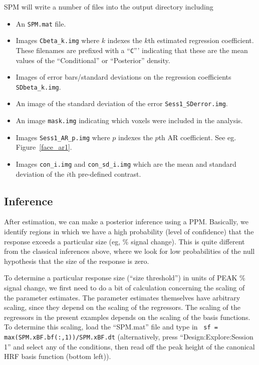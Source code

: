 SPM will write a number of files into the output directory including 
\begin{itemize}
\item An \texttt{SPM.mat} file.
\item Images \texttt{Cbeta\_k.img} where $k$ indexes the $k$th estimated regression coefficient. These filenames are prefixed with a ``\texttt{C}''' indicating that these are the mean values of the ``Conditional'' or ``Posterior'' density.
\item Images of error bars/standard deviations on the regression coefficients \texttt{SDbeta\_k.img}.
\item An image of the standard deviation of the error \texttt{Sess1\_SDerror.img}.
\item An image \texttt{mask.img} indicating which voxels  were included in the analysis.
\item Images \texttt{Sess1\_AR\_p.img} where $p$ indexes the $p$th AR coefficient. See eg. Figure~\ref{face_ar1}.
\item Images \texttt{con\_i.img} and \texttt{con\_sd\_i.img} which are the mean and standard deviation of the $i$th pre-defined contrast.
\end{itemize}

\subsection{Inference}

After estimation, we can make a posterior inference using a PPM. Basically, we identify regions in which we have a high probability (level of confidence) that the response exceeds a particular size (eg, \% signal change). This is quite different from the classical inferences above, where we look for low probabilities of the null hypothesis that the size of the response is zero.

To determine a particular response size (``size threshold'') in units of PEAK \% signal change, we first need to do a bit of calculation concerning the scaling of the parameter estimates. The parameter estimates themselves have arbitrary scaling, since they depend on the scaling of the regressors. The scaling of the regressors in the present examples depends on the scaling of the basis functions. To determine this scaling, load the ``SPM.mat'' file and type in \matlab\ \texttt{sf = max(SPM.xBF.bf(:,1))/SPM.xBF.dt} (alternatively, press ``Design:Explore:Session 1'' and select any of the conditions, then read off the peak height of the canonical HRF basis function (bottom left)).


